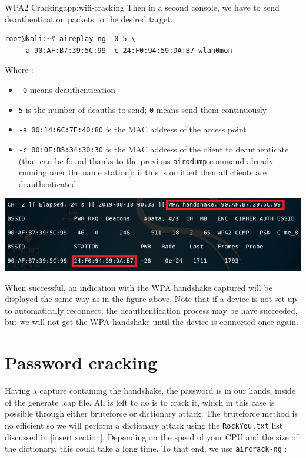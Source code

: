 \begin{appchaptercover}{WPA2 Cracking}{app:wifi-cracking}
Then in a second console, we have to send deauthentication packets to the desired target.

\begin{center}
\begin{minipage}{.75\linewidth}
\begin{lstlisting}
root@kali:~# aireplay-ng -0 5 \
	-a 90:AF:B7:39:5C:99 -c 24:F0:94:59:DA:B7 wlan0mon
\end{lstlisting}
\end{minipage}
\end{center}

Where :
\begin{itemize}
  \item \texttt{-0} means deauthentication
  \item \texttt{5} is the number of deauths to send; \texttt{0} means send them continuously
  \item \texttt{-a 00:14:6C:7E:40:80} is the MAC address of the access point
  \item \texttt{-c 00:0F:B5:34:30:30} is the MAC address of the client to deauthenticate (that can be found thanks to the previous \texttt{airodump} command already running uner the name station); if this is omitted then all clients are deauthenticated
\end{itemize}

\begin{center}
\includegraphics[width=\linewidth]{figures/wpa2-cracking-wpa-handshake}
\end{center}

When successful, an indication with the WPA handshake captured will be displayed the same way as in the figure above. Note that if a device is not set up to automatically reconnect, the deauthentication process may be have succeeded, but we will not get the WPA handshake until the device is connected once again.

\section{Password cracking}

Having a capture containing the handshake, the password is in our hands, inside of the generate .cap file. All is left to do is to crack it, which in this case is possible through either bruteforce or dictionary attack. The bruteforce method is no efficient so we will perform a dictionary attack using the \texttt{RockYou.txt} list discussed in [insert section]. Depending on the speed of your CPU and the size of the dictionary, this could take a long time. To that end, we use \texttt{aircrack-ng} :


\end{appchaptercover}

